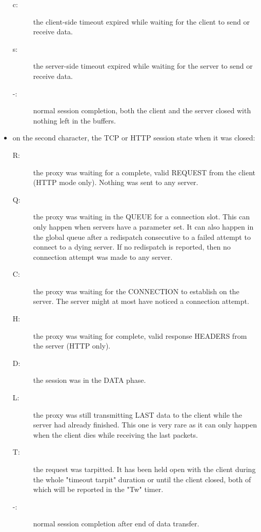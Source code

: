 \begin{itemize}
\begin{description}
    \item[c:]
            the client-side timeout expired while waiting for the client to
            send or receive data.
    \item[s:]
            the server-side timeout expired while waiting for the server to
            send or receive data.
    \item[-:]
            normal session completion, both the client and the server closed
            with nothing left in the buffers.
    \end{description}
    
\item
     on the second character, the TCP or HTTP session state when it was closed:
     
        \begin{description}
        \item[R:]
            the proxy was waiting for a complete, valid REQUEST from the client
            (HTTP mode only). Nothing was sent to any server.
        \item[Q:]
            the proxy was waiting in the QUEUE for a connection slot. This can
            only happen when servers have a  parameter set. It can
            also happen in the global queue after a redispatch consecutive to
            a failed attempt to connect to a dying server. If no redispatch is
            reported, then no connection attempt was made to any server.
        \item[C:]
            the proxy was waiting for the CONNECTION to establish on the
            server. The server might at most have noticed a connection attempt.
        \item[H:]
            the proxy was waiting for complete, valid response HEADERS from the
            server (HTTP only).
        \item[D:]
            the session was in the DATA phase.
        \item[L:]
            the proxy was still transmitting LAST data to the client while the
            server had already finished. This one is very rare as it can only
            happen when the client dies while receiving the last packets.
        \item[T:]
            the request was tarpitted. It has been held open with the client
            during the whole "timeout tarpit" duration or until the client
            closed, both of which will be reported in the "Tw" timer.
        \item[-:]
            normal session completion after end of data transfer.
        \end{description}


\end{itemize}
